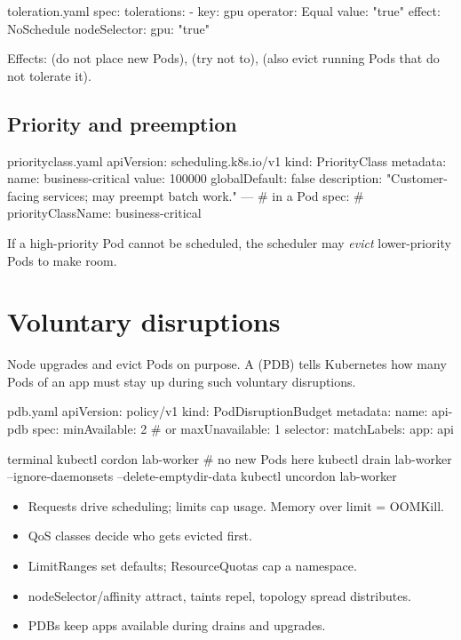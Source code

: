 \begin{yamlcode}{toleration.yaml}
spec:
  tolerations:
    - key: gpu
      operator: Equal
      value: "true"
      effect: NoSchedule
  nodeSelector:
    gpu: "true"
\end{yamlcode}

Effects:  (do not place new Pods),  (try
not to),  (also evict running Pods that do not tolerate it).

\subsection{Priority and preemption}

\begin{yamlcode}{priorityclass.yaml}
apiVersion: scheduling.k8s.io/v1
kind: PriorityClass
metadata:
  name: business-critical
value: 100000
globalDefault: false
description: "Customer-facing services; may preempt batch work."
---
# in a Pod spec:
# priorityClassName: business-critical
\end{yamlcode}

If a high-priority Pod cannot be scheduled, the scheduler may \emph{evict}
lower-priority Pods to make room.

\section{Voluntary disruptions}

Node upgrades and  evict Pods on purpose. A
 (PDB) tells Kubernetes how many Pods of an app must
stay up during such voluntary disruptions.

\begin{yamlcode}{pdb.yaml}
apiVersion: policy/v1
kind: PodDisruptionBudget
metadata:
  name: api-pdb
spec:
  minAvailable: 2           # or maxUnavailable: 1
  selector:
    matchLabels: { app: api }
\end{yamlcode}

\begin{bashcode}{terminal}
kubectl cordon lab-worker                              # no new Pods here
kubectl drain lab-worker --ignore-daemonsets --delete-emptydir-data
kubectl uncordon lab-worker
\end{bashcode}

\begin{recap}
\begin{itemize}
  \item Requests drive scheduling; limits cap usage. Memory over limit = OOMKill.
  \item QoS classes decide who gets evicted first.
  \item LimitRanges set defaults; ResourceQuotas cap a namespace.
  \item nodeSelector/affinity attract, taints repel, topology spread distributes.
  \item PDBs keep apps available during drains and upgrades.
\end{itemize}
\end{recap}

